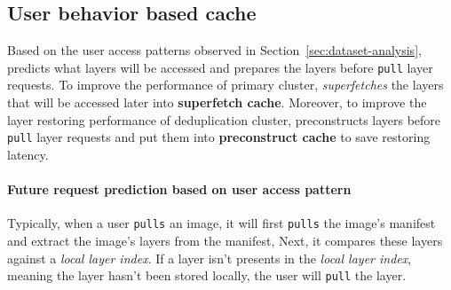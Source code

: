 
\subsection{User behavior based cache}
\label{sec:cache-design}


%


Based on the user access patterns observed in Section~\ref{sec:dataset-analysis},
\sysname predicts what layers will be accessed and prepares the layers before \texttt{pull} layer requests.
To improve the performance of primary cluster,
\sysname \emph{superfetches} the layers that will be accessed later into \textbf{superfetch cache}.
Moreover, 
to improve the layer restoring performance of deduplication cluster,
\sysname preconstructs layers before \texttt{pull} layer requests 
and put them into \textbf{preconstruct cache} to save restoring latency.

\paragraph{Future request prediction based on user access pattern}
%
%
Typically, when a user 
 \texttt{pulls} an image,
it will first \texttt{pulls} the image's manifest and extract the image's layers from the manifest, 
Next, it compares these layers against a \emph{local layer index}.
If a layer isn't presents in the \emph{local layer index}, meaning the layer hasn't been stored locally,
the user will \texttt{pull} the layer.

